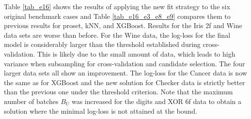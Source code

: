 %
Table \ref{tab_e16} shows the results of applying the new fit strategy to the six original benchmark cases and Table \ref{tab_e16_e3_e8_e9} compares them to previous results for proset, kNN, and XGBoost.
Results for the Iris 2f and Wine data sets are worse than before.
For the Wine data, the log-loss for the final model is considerably larger than the threshold established during cross-validation.
This is likely due to the small amount of data, which leads to high variance when subsampling for cross-validation and candidate selection.
The four larger data sets all show an improvement.
The log-loss for the Cancer data is now the same as for XGBoost and the new solution for Checker data is strictly better than the previous one under the threshold criterion.
Note that the maximum number of batches $B_U$ was increased for the digits and XOR 6f data to obtain a solution where the minimal log-loss is not attained at the bound.\par
%
